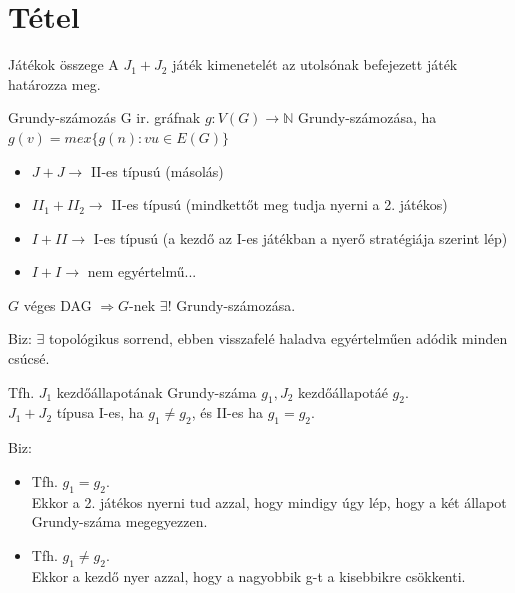 \newpage
\section{Tétel}
\begin{definition}{Játékok összege}{}
    A $J_1 + J_2$ játék kimenetelét az utolsónak befejezett játék határozza meg.
\end{definition}

\begin{definition}{Grundy-számozás}{}
    G ir. gráfnak $g: V(G) \rightarrow \mathbb{N}$ Grundy-számozása, ha $g(v)=mex \{g(n): vu\in E(G)\}$ 
\end{definition}

\begin{observation}{}{}
	\begin{itemize}
		\item $J + J\rightarrow$ II-es típusú (másolás)
		\item $II_1 + II_2\rightarrow$ II-es típusú (mindkettőt meg tudja nyerni a 2. játékos)
		\item $I + II\rightarrow$ I-es típusú (a kezdő az I-es játékban a nyerő stratégiája szerint lép)
		\item $I + I\rightarrow$ nem egyértelmű...
	\end{itemize}
\end{observation}

\begin{statement}{}{}
	$G$ véges DAG $\Rightarrow G$-nek $\exists$! Grundy-számozása.
\end{statement}
Biz: $\exists$ topológikus sorrend, ebben visszafelé haladva egyértelműen adódik minden csúcsé.
	
\begin{statement}{}{}
	Tfh. $J_1$ kezdőállapotának Grundy-száma $g_1, J_2$ kezdőállapotáé $g_2$. \\
	$J_1 + J_2$ típusa I-es, ha $g_1 \not= g_2$, és II-es ha $g_1 = g_2$.
\end{statement}
Biz: 
\begin{itemize}
	\item Tfh. $g_1=g_2$. \\
	Ekkor a 2. játékos nyerni tud azzal, hogy mindigy úgy lép, hogy a két állapot Grundy-száma megegyezzen.
	\item Tfh. $g_1 \not= g_2$.  \\
	Ekkor a kezdő nyer azzal, hogy a nagyobbik g-t a kisebbikre csökkenti.
\end{itemize}


